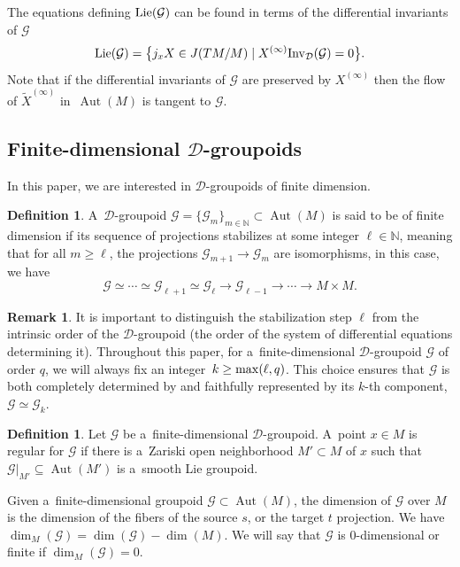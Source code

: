 \documentclass[10pt,a4paper]{amsart}
\numberwithin{equation}{section}
\theoremstyle{definition}
\newtheorem{Definition}[Theorem]{Definition}
\newtheorem{Remark}[Theorem]{Remark}
\begin{document}
The equations defining ${\rm Lie}(\mathcal G)$ can be found in terms of the differential invariants of $\mathcal G$
\[{\rm Lie}(\mathcal G) = \big\{j_x X \in J(TM/M) \mid X^{(\infty)}{\rm Inv}_{\mathcal D}(\mathcal G)=0\big\}.
\]
Note that if the differential invariants of $\mathcal G$ are preserved by $X^{(\infty)}$ then the flow of $\widetilde X^{(\infty)}$ in~$\operatorname{Aut}(M)$ is tangent to $\mathcal G$.

\subsection[Finite-dimensional D-groupoids]{Finite-dimensional $\boldsymbol{\mathcal D}$-groupoids}

In this paper, we are interested in $\mathcal D$-groupoids of finite dimension.

\begin{Definition} A~$\mathcal{D}$-groupoid $\mathcal{G} = \{\mathcal{G}_m\}_{m\in \mathbb N}\subset \operatorname{Aut}(M)$ is said to be of finite dimension if its sequence of projections stabilizes at some integer $\ell \in \mathbb N$, meaning that for all $m \geq \ell$, the projections $\mathcal{G}_{m+1}\to \mathcal{G}_m$ are isomorphisms, in this case, we have
 \[\mathcal G \simeq \cdots \simeq \mathcal G_{\ell+1} \simeq \mathcal G_\ell \to \mathcal G_{\ell-1} \to \cdots \to M\times M.\]
\end{Definition}

\begin{Remark}
 It is important to distinguish the stabilization step $\ell$ from the intrinsic order of the $\mathcal{D}$-groupoid (the order of the system of differential equations determining it). Throughout this paper, for a~finite-dimensional $\mathcal{D}$-groupoid $\mathcal{G}$ of order $q$, we will always fix an integer~${k \geq {\rm max}(\ell, q)}$. This choice ensures that $\mathcal{G}$ is both completely determined by and faithfully represented by its $k$-th component, $\mathcal{G} \simeq \mathcal{G}_k$.
\end{Remark}
\begin{Definition}
 Let $\mathcal{G}$ be a~finite-dimensional $\mathcal{D}$-groupoid. A~point $x\in M$ is regular for $\mathcal G$ if there is a~Zariski open neighborhood $M'\subset M$ of $x$ such that $\mathcal G|_{M'}\subseteq \operatorname{Aut}(M')$ is a~smooth Lie groupoid.
\end{Definition}

Given a~finite-dimensional groupoid $\mathcal G\subset \operatorname{Aut}(M)$, the dimension of $\mathcal G$ over $M$ is the dimension of the fibers of the source $s$, or the target $t$ projection. We have $\dim_M(\mathcal G) = \dim(\mathcal G)-\dim(M)$. We will say that $\mathcal G$ is $0$-dimensional or finite if $\dim_M(\mathcal G) = 0$.
\end{document}
